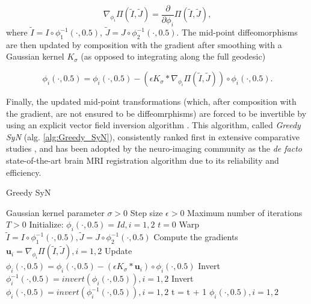 \begin{equation}\label{eq:grad_metric}
    \nabla_{\phi_{i}} \Pi(\tilde{I}, \tilde{J}) = \frac{\partial}{\partial \phi_{i}} \Pi \left( \tilde{I}, \tilde{J}\right),
\end{equation}
where $\tilde{I} = I \circ \phi_{1}^{-1}(\cdot, 0.5)$, $\tilde{J} = J \circ \phi_{2}^{-1}(\cdot, 0.5)$. The mid-point diffeomorphisms are then updated by composition with
the gradient after smoothing with a Gaussian kernel $K_{\sigma}$ (as opposed to integrating along the full geodesic)

\begin{equation}\label{eq:gsyn_update}
    \phi_{i}(\cdot, 0.5) = \phi_{i}(\cdot, 0.5) - \left( \epsilon K_{\sigma} \ast \nabla_{\phi_{i}} \Pi(\tilde{I}, \tilde{J}) \right) \circ \phi_{i}(\cdot, 0.5).
\end{equation}

Finally, the updated mid-point transformations (which, after composition with the gradient, are not ensured to be diffeomrphisms) are forced to be invertible by using an
explicit vector field inversion algorithm \cite{Chen2008}. This algorithm, called \textit{Greedy SyN} (alg. \ref{alg:Greedy_SyN}), consistently ranked first in extensive comparative
studies \cite{Klein2009}\cite{Klein2010}\cite{Rohlfing2012}, and has been adopted by the neuro-imaging community as the \textit{de facto} state-of-the-art brain
MRI registration algorithm due to its reliability and efficiency.

\begin{algorithm}[h!]
\caption{Greedy SyN}\label{alg:Greedy_SyN}
\begin{algorithmic}[1]
\REQUIRE Gaussian kernel parameter $\sigma>0$
\REQUIRE Step size $\epsilon>0$
\REQUIRE Maximum number of iterations $T>0$
\STATE Initialize: $\phi_{i}(\cdot, 0.5) = Id, i=1, 2$
\STATE $t=0$
\REPEAT
    \STATE Warp $\tilde{I}  = I \circ \phi_{1}^{-1}(\cdot, 0.5), \tilde{J} = J \circ \phi_{2}^{-1}(\cdot, 0.5)$
    \STATE Compute the gradients $\mathbf{u}_{i} = \nabla_{\phi_{i}} \Pi(\tilde{I}, \tilde{J}), i=1,2$
    \STATE Update $\phi_{i}(\cdot, 0.5) = \phi_{i}(\cdot, 0.5) - \left( \epsilon K_{\sigma} \ast \mathbf{u}_{i} \right) \circ \phi_{i}(\cdot, 0.5)$
    \STATE Invert $\phi_{i}^{-1}(\cdot, 0.5) = invert (\phi_{i}(\cdot, 0.5)), i=1, 2$
    \STATE Invert $\phi_{i}(\cdot, 0.5) = invert (\phi_{i}^{-1}(\cdot, 0.5)), i=1, 2$
    \STATE t = t + 1
\RETURN $\phi_{i}(\cdot, 0.5), i=1,2$
\end{algorithmic}
\end{algorithm}

